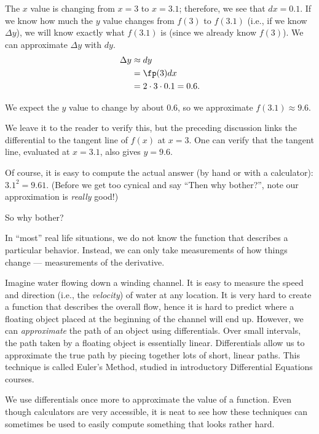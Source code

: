 {The $x$ value is changing from $x=3$ to $x=3.1$; therefore, we see that $dx=0.1$. If we know how much the $y$ value changes from $f(3)$ to $f(3.1)$ (i.e., if we know $\Delta y$), we will know exactly what $f(3.1)$ is (since we already know $f(3)$). We can approximate $\Delta y$ with $dy$.
\begin{align*}
	\Delta y &\approx dy \\
	&= \fp(3)dx \\
	&= 2\cdot 3\cdot 0.1 = 0.6.
\end{align*}

We expect the $y$ value to change by about $0.6$, so we approximate $f(3.1) \approx 9.6.$

We leave it to the reader to verify this, but the preceding discussion links the differential to the tangent line of $f(x)$ at $x=3$. One can verify that the tangent line, evaluated at $x=3.1$, also gives $y=9.6$.}

Of course, it is easy to compute the actual answer (by hand or with a calculator): $3.1^2 = 9.61.$ (Before we get too cynical and say ``Then why bother?'', note our approximation is \textit{really} good!)

So why bother?

In ``most'' real life situations, we do not know the function that describes a particular behavior. Instead, we can only take measurements of how things change --- measurements of the derivative.

Imagine water flowing down a winding channel. It is easy to measure the speed and direction (i.e., the \textit{velocity}) of water at any location. It is very hard to create a function that describes the overall flow, hence it is hard to predict where a floating object placed at the beginning of the channel will end up. However, we can \textit{approximate} the path of an object using differentials. Over small intervals, the path taken by a floating object is essentially linear. Differentials allow us to approximate the true path by piecing together lots of short, linear paths. This technique is called Euler's Method, studied in introductory Differential Equations courses.

We use differentials once more to approximate the value of a function. Even though calculators are very accessible, it is neat to see how these techniques can sometimes be used to easily compute something that looks rather hard.

